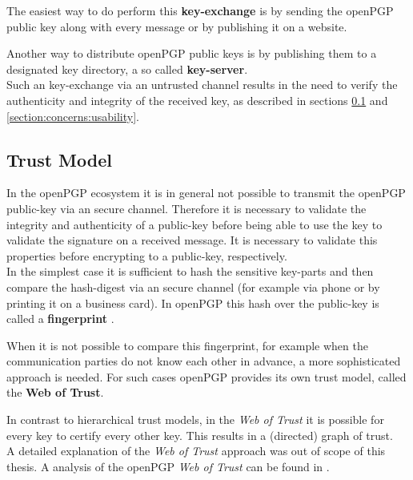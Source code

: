 The easiest way to do perform this \textbf{key-exchange} is by sending the openPGP public key along with every message or by publishing it on a website. 

Another way to distribute openPGP public keys is by publishing them to a designated key directory, a so called \textbf{key-server}. \\

Such an key-exchange via an untrusted channel results in the need to verify the authenticity and integrity of the received key, as described in sections \ref{section:openpgp:trustmodel} and \ref{section:concerns:usability}.

\subsection{Trust Model} \label{section:openpgp:trustmodel}

In the openPGP ecosystem it is in general not possible to transmit the openPGP public-key via an secure channel. Therefore it is necessary to validate the integrity and authenticity of a public-key before being able to use the key to validate the signature on a received message. It is necessary to validate this properties before encrypting to a public-key, respectively. \\

In the simplest case it is sufficient to hash the sensitive key-parts and then compare the hash-digest via an secure channel (for example via phone or by printing it on a business card). In openPGP this hash over the public-key is called a \textbf{fingerprint} \citep[section 12.2]{RFC4880}.

When it is not possible to compare this fingerprint, for example when the communication parties do not know each other in advance, a more sophisticated approach is needed. For such cases openPGP provides its own trust model, called the \textbf{Web of Trust}.

In contrast to hierarchical trust models, in the \textit{Web of Trust} it is possible for every key to certify every other key. 
This results in a (directed) graph of trust. \\


A detailed explanation of the \textit{Web of Trust} approach was out of scope of this thesis. A analysis of the openPGP \textit{Web of Trust} can be found in \cite{Ulrich2011}. 

